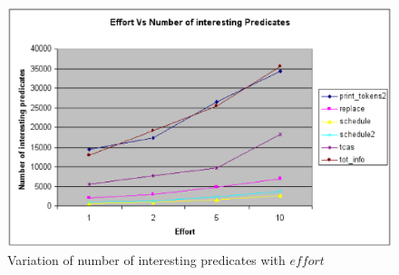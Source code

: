 \begin{figure}
  \centering
  \includegraphics[width=\columnwidth]{charts/effort}
  \caption{Variation of number of interesting predicates with $effort$}
  \label{fig-effort}
\end{figure}

